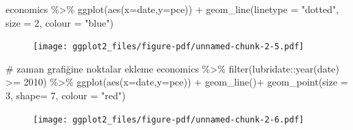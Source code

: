 \documentclass[
  letterpaper,
  DIV=11,
  numbers=noendperiod]{scrreprt}
\newenvironment{Shaded}{\begin{snugshade}}{\end{snugshade}}
\newcommand{\AttributeTok}[1]{\textcolor[rgb]{0.40,0.45,0.13}{#1}}
\newcommand{\CommentTok}[1]{\textcolor[rgb]{0.37,0.37,0.37}{#1}}
\newcommand{\DecValTok}[1]{\textcolor[rgb]{0.68,0.00,0.00}{#1}}
\newcommand{\FunctionTok}[1]{\textcolor[rgb]{0.28,0.35,0.67}{#1}}
\newcommand{\NormalTok}[1]{\textcolor[rgb]{0.00,0.23,0.31}{#1}}
\newcommand{\SpecialCharTok}[1]{\textcolor[rgb]{0.37,0.37,0.37}{#1}}
\newcommand{\StringTok}[1]{\textcolor[rgb]{0.13,0.47,0.30}{#1}}
\begin{document}
\begin{Shaded}
\begin{Highlighting}[]
\NormalTok{economics }\SpecialCharTok{\%\textgreater{}\%} 
  \FunctionTok{ggplot}\NormalTok{(}\FunctionTok{aes}\NormalTok{(}\AttributeTok{x=}\NormalTok{date,}\AttributeTok{y=}\NormalTok{pce)) }\SpecialCharTok{+}
  \FunctionTok{geom\_line}\NormalTok{(}\AttributeTok{linetype =} \StringTok{"dotted"}\NormalTok{, }\AttributeTok{size =} \DecValTok{2}\NormalTok{, }\AttributeTok{colour =} \StringTok{"blue"}\NormalTok{)}
\end{Highlighting}
\end{Shaded}

\begin{figure}[H]

{\centering \texttt{[image: ggplot2\_files/figure-pdf/unnamed-chunk-2-5.pdf]}

}

\end{figure}

\begin{Shaded}
\begin{Highlighting}[]
\CommentTok{\# zaman grafiğine noktalar ekleme}
\NormalTok{economics }\SpecialCharTok{\%\textgreater{}\%} 
  \FunctionTok{filter}\NormalTok{(lubridate}\SpecialCharTok{::}\FunctionTok{year}\NormalTok{(date) }\SpecialCharTok{\textgreater{}=} \DecValTok{2010}\NormalTok{) }\SpecialCharTok{\%\textgreater{}\%} 
  \FunctionTok{ggplot}\NormalTok{(}\FunctionTok{aes}\NormalTok{(}\AttributeTok{x=}\NormalTok{date,}\AttributeTok{y=}\NormalTok{pce)) }\SpecialCharTok{+}
  \FunctionTok{geom\_line}\NormalTok{()}\SpecialCharTok{+}
  \FunctionTok{geom\_point}\NormalTok{(}\AttributeTok{size =} \DecValTok{3}\NormalTok{, }\AttributeTok{shape=} \DecValTok{7}\NormalTok{, }\AttributeTok{colour =} \StringTok{"red"}\NormalTok{)}
\end{Highlighting}
\end{Shaded}

\begin{figure}[H]

{\centering \texttt{[image: ggplot2\_files/figure-pdf/unnamed-chunk-2-6.pdf]}

}

\end{figure}
\end{document}
